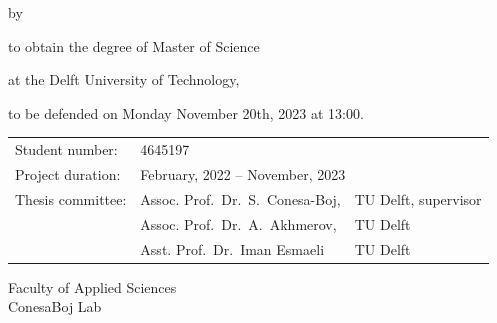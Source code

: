 \begin{titlepage}

\begin{center}

{\makeatletter
\largetitlestyle\fontsize{45}{45}\selectfont\@title
\makeatother}

{\makeatletter
\ifdefvoid{\@subtitle}{}{\bigskip\titlestyle\fontsize{20}{20}\selectfont\@subtitle}
\makeatother}

\bigskip
\bigskip

by

\bigskip
\bigskip

{\makeatletter
\largetitlestyle\fontsize{25}{25}\selectfont\@author
\makeatother}

\bigskip
\bigskip

to obtain the degree of Master of Science

at the Delft University of Technology,

to be defended on Monday November 20th, 2023 at 13:00.

\vfill

\begin{tabular}{lll}
    Student number: & 4645197 \\
    Project duration: & \multicolumn{2}{l}{February, 2022 -- November, 2023} \\
    Thesis committee: & Assoc. Prof.\ Dr.\ S.\ Conesa-Boj, & TU Delft, supervisor \\
        & Assoc. Prof.\ Dr.\ A.\ Akhmerov, & TU Delft \\
        & Asst. Prof.\ Dr.\ Iman Esmaeli & TU Delft
\end{tabular}


\bigskip
\bigskip
Faculty of Applied Sciences \\
ConesaBoj Lab \\


\end{center}


\end{titlepage}
